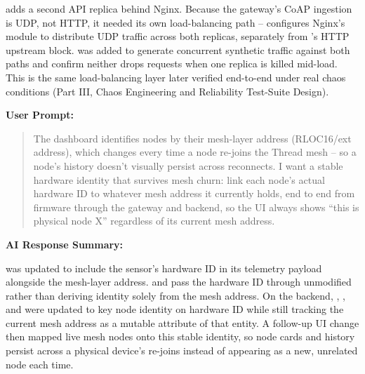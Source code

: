 \documentclass[conference]{IEEEtran}
\begin{document}
\texttt{} adds a second API replica behind Nginx. Because the gateway's CoAP ingestion is UDP, not HTTP, it needed its own load-balancing path -- \texttt{} configures Nginx's \texttt{} module to distribute UDP traffic across both replicas, separately from \texttt{}'s HTTP upstream block. \texttt{} was added to generate concurrent synthetic traffic against both paths and confirm neither drops requests when one replica is killed mid-load. This is the same load-balancing layer later verified end-to-end under real chaos conditions (Part III, Chaos Engineering and Reliability Test-Suite Design).

\par\vspace{4pt}\par\vspace{2pt}

\noindent\textbf{User Prompt:}\par

\begin{quote}
The dashboard identifies nodes by their mesh-layer address (RLOC16/ext address), which changes every time a node re-joins the Thread mesh -- so a node's history doesn't visually persist across reconnects. I want a stable hardware identity that survives mesh churn: link each node's actual hardware ID to whatever mesh address it currently holds, end to end from firmware through the gateway and backend, so the UI always shows ``this is physical node X'' regardless of its current mesh address.
\end{quote}

\noindent\textbf{AI Response Summary:}\par

\texttt{} was updated to include the sensor's hardware ID in its telemetry payload alongside the mesh-layer address. \texttt{} and \texttt{} pass the hardware ID through unmodified rather than deriving identity solely from the mesh address. On the backend, \texttt{}, \texttt{}, and \texttt{} were updated to key node identity on hardware ID while still tracking the current mesh address as a mutable attribute of that entity. A follow-up UI change then mapped live mesh nodes onto this stable identity, so node cards and history persist across a physical device's re-joins instead of appearing as a new, unrelated node each time.
\end{document}
